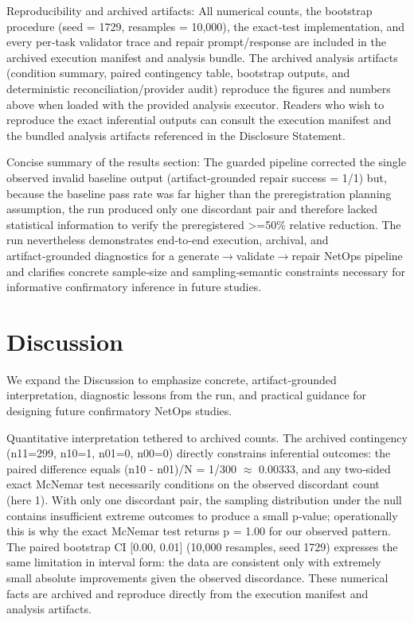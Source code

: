 \documentclass[conference]{IEEEtran}
\begin{document}
Reproducibility and archived artifacts: All numerical counts, the bootstrap procedure (seed = 1729, resamples = 10,000), the exact‑test implementation, and every per‑task validator trace and repair prompt/response are included in the archived execution manifest and analysis bundle. The archived analysis artifacts (condition summary, paired contingency table, bootstrap outputs, and deterministic reconciliation/provider audit) reproduce the figures and numbers above when loaded with the provided analysis executor. Readers who wish to reproduce the exact inferential outputs can consult the execution manifest and the bundled analysis artifacts referenced in the Disclosure Statement.

Concise summary of the results section: The guarded pipeline corrected the single observed invalid baseline output (artifact‑grounded repair success = 1/1) but, because the baseline pass rate was far higher than the preregistration planning assumption, the run produced only one discordant pair and therefore lacked statistical information to verify the preregistered >=50\% relative reduction. The run nevertheless demonstrates end‑to‑end execution, archival, and artifact‑grounded diagnostics for a generate\ensuremath{\rightarrow}validate\ensuremath{\rightarrow}repair NetOps pipeline and clarifies concrete sample‑size and sampling‑semantic constraints necessary for informative confirmatory inference in future studies.

\section{Discussion}
We expand the Discussion to emphasize concrete, artifact‑grounded interpretation, diagnostic lessons from the run, and practical guidance for designing future confirmatory NetOps studies.

Quantitative interpretation tethered to archived counts. The archived contingency (n11=299, n10=1, n01=0, n00=0) directly constrains inferential outcomes: the paired difference equals (n10 - n01)/N = 1/300 \ensuremath{\approx} 0.00333, and any two‑sided exact McNemar test necessarily conditions on the observed discordant count (here 1). With only one discordant pair, the sampling distribution under the null contains insufficient extreme outcomes to produce a small p‑value; operationally this is why the exact McNemar test returns p = 1.00 for our observed pattern. The paired bootstrap CI [0.00, 0.01] (10,000 resamples, seed 1729) expresses the same limitation in interval form: the data are consistent only with extremely small absolute improvements given the observed discordance. These numerical facts are archived and reproduce directly from the execution manifest and analysis artifacts.
\end{document}
